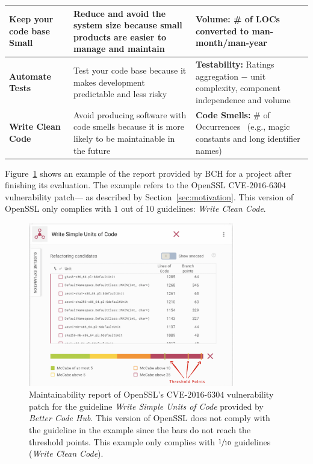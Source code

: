 \documentclass[smallextended]{svjour3}       %
\begin{document}
\begin{table}[h]
\begin{tabular}{L{2cm}L{4.5cm}L{4cm}}
\textbf{Keep your code base Small} & Reduce and avoid the system size because
small products are easier to manage and maintain & \textbf{Volume:} \# of LOCs converted 
to man-month/man-year~\cite{criteria:2017} \\\midrule

\textbf{Automate Tests} & Test your code base because it makes development
predictable and less risky & \textbf{Testability:} Ratings aggregation $-$ unit 
complexity, component independence and volume~\cite{Visser:2016:OREILLY}
 \\\midrule

\textbf{Write Clean Code} & Avoid producing software with code smells because
it is more likely to be maintainable in the future & \textbf{Code Smells:} 
\# of Occurrences~\cite{Visser:2016:OREILLY} (e.g., magic constants and long 
identifier names) \\
\bottomrule
\end{tabular}
\label{tab:guidelines}
\end{table}

Figure~\ref{fig:bchrep} shows an example of the report provided by BCH 
for a project after finishing its evaluation. The example
refers to the OpenSSL CVE-$2016$-$6304$ vulnerability patch---
as described by Section~\ref{sec:motivation}. This version of 
OpenSSL only complies with $1$ out of $10$ guidelines: \emph{Write 
Clean Code}.

\begin{figure}[h]
 	\centering 	
	\includegraphics[width=0.8\textwidth]{figures/bch_report.png}
 	\caption{Maintainability report of OpenSSL's CVE-$2016$-$6304$ 
	vulnerability patch for the guideline \emph{Write Simple Units 
	of Code} provided by \emph{Better Code Hub}. This version of 
	OpenSSL does not comply with the guideline in the example since 
	the bars do not reach the threshold points. This example only 
	complies with $\sfrac{1}{10}$ guidelines (\emph{Write Clean 
	Code}).}
	\label{fig:bchrep}
\end{figure}
\end{document}
